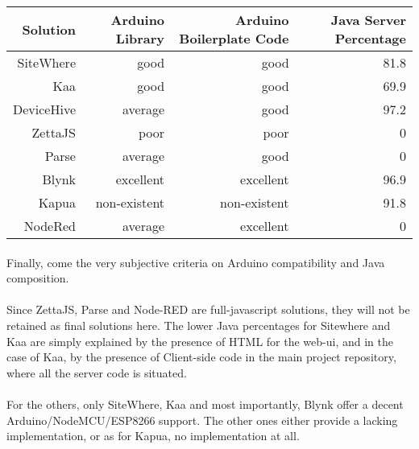 \documentclass{article}
\begin{document}
\begin{center}
\begin{tabular}{r|r|r|r}
Solution & Arduino Library & Arduino Boilerplate Code & Java Server Percentage \\ \hline
SiteWhere & \cellcolor{blue!10}good & \cellcolor{blue!10}good & \cellcolor{green!25}81.8 \\
Kaa & \cellcolor{blue!10}good & \cellcolor{blue!10}good & \cellcolor{green!25}69.9 \\
DeviceHive & \cellcolor{yellow!25}average & \cellcolor{blue!10}good & \cellcolor{green!25}97.2 \\
ZettaJS & \cellcolor{orange!25}poor & \cellcolor{orange!25}poor & \cellcolor{red!25}0 \\
Parse & \cellcolor{yellow!25}average & \cellcolor{blue!10}good & \cellcolor{red!25}0 \\
Blynk & \cellcolor{green!25}excellent & \cellcolor{green!25}excellent & \cellcolor{green!25}96.9 \\
Kapua & \cellcolor{red!25}non-existent & \cellcolor{red!25}non-existent & \cellcolor{green!25}91.8 \\
NodeRed & \cellcolor{yellow!25}average & \cellcolor{green!25}excellent & \cellcolor{red!25}0 \\
\end{tabular}
\end{center}

\paragraph{} Finally, come the very subjective criteria on Arduino compatibility and Java composition.

\paragraph{} Since ZettaJS, Parse and Node-RED are full-javascript solutions, they will not be retained as final solutions here. The lower Java percentages for Sitewhere and Kaa are simply explained by the presence of HTML for the web-ui, and in the case of Kaa, by the presence of Client-side code in the main project repository, where all the server code is situated.

\paragraph{} For the others, only SiteWhere, Kaa and most importantly, Blynk offer a decent Arduino/NodeMCU/ESP8266 support. The other ones either provide a lacking implementation, or as for Kapua, no implementation at all.
\end{document}
